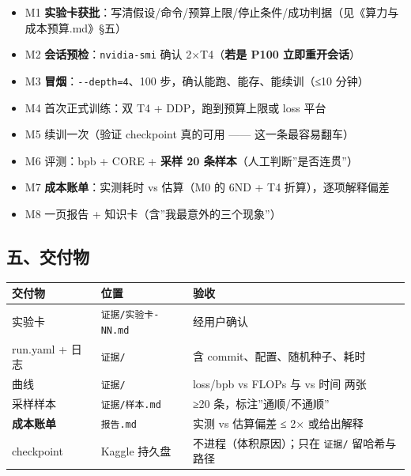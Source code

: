 \documentclass[
  chinese,
  11pt,
]{ctexart}
\newcounter{none} %
\providecommand{\tightlist}{%
  \setlength{\itemsep}{0pt}\setlength{\parskip}{0pt}}
\begin{document}
\begin{itemize}
\tightlist
\item[$\square$]
  M1 \textbf{实验卡获批}：写清假设/命令/预算上限/停止条件/成功判据（见《算力与成本预算.md》§五）
\item[$\square$]
  M2 \textbf{会话预检}：\texttt{nvidia-smi} 确认 2×T4（\textbf{若是 P100 立即重开会话}）
\item[$\square$]
  M3 \textbf{冒烟}：\texttt{-\/-depth=4}、100 步，确认能跑、能存、能续训（≤10 分钟）
\item[$\square$]
  M4 首次正式训练：双 T4 + DDP，跑到预算上限或 loss 平台
\item[$\square$]
  M5 续训一次（验证 checkpoint 真的可用 ------ 这一条最容易翻车）
\item[$\square$]
  M6 评测：bpb + CORE + \textbf{采样 20 条样本}（人工判断''是否连贯''）
\item[$\square$]
  M7 \textbf{成本账单}：实测耗时 vs 估算（M0 的 6ND + T4 折算），逐项解释偏差
\item[$\square$]
  M8 一页报告 + 知识卡（含''我最意外的三个现象''）
\end{itemize}

\subsection{五、交付物}\label{ux4e94ux4ea4ux4ed8ux7269-2}

{\def\LTcaptype{none} %
\begin{longtable}[]{@{}
  >{\raggedright\arraybackslash}p{}
  >{\raggedright\arraybackslash}p{}
  >{\raggedright\arraybackslash}p{}@{}}
\toprule\noalign{}
\begin{minipage}[b]{\linewidth}\raggedright
交付物
\end{minipage} & \begin{minipage}[b]{\linewidth}\raggedright
位置
\end{minipage} & \begin{minipage}[b]{\linewidth}\raggedright
验收
\end{minipage} \\
\midrule\noalign{}
\endhead
\bottomrule\noalign{}
\endlastfoot
实验卡 & \texttt{证据/实验卡-NN.md} & 经用户确认 \\
run.yaml + 日志 & \texttt{证据/} & 含 commit、配置、随机种子、耗时 \\
曲线 & \texttt{证据/} & loss/bpb vs FLOPs 与 vs 时间 两张 \\
采样样本 & \texttt{证据/样本.md} & ≥20 条，标注''通顺/不通顺'' \\
\textbf{成本账单} & \texttt{报告.md} & 实测 vs 估算偏差 ≤ 2× 或给出解释 \\
checkpoint & Kaggle 持久盘 & 不进程（体积原因）；只在 \texttt{证据/} 留哈希与路径 \\
\end{longtable}
}
\end{document}
